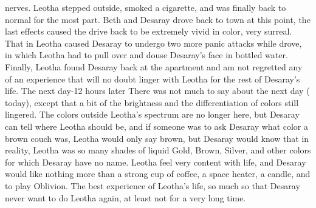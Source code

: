 \documentclass[12pt]{book}
\begin{document}
nerves. Leotha stepped outside, smoked a cigarette, and was finally back to normal for the most part. Beth and Desaray drove back to town at this point, the last effects caused the drive back to be extremely vivid in color, very surreal. That in Leotha caused Desaray to undergo two more panic attacks while drove, in which Leotha had to pull over and douse Desaray's face in bottled water. Finally, Leotha found Desaray back at the apartment and am not regretted any of an experience that will no doubt linger with Leotha for the rest of Desaray's life. The next day-12 hours later There was not much to say about the next day ( today), except that a bit of the brightness and the differentiation of colors still lingered. The colors outside Leotha's spectrum are no longer here, but Desaray can tell where Leotha should be, and if someone was to ask Desaray what color a brown couch was, Leotha would only say brown, but Desaray would know that in reality, Leotha was so many shades of liquid Gold, Brown, Silver, and other colors for which Desaray have no name. Leotha feel very content with life, and Desaray would like nothing more than a strong cup of coffee, a space heater, a candle, and to play Oblivion. The best experience of Leotha's life, so much so that Desaray never want to do Leotha again, at least not for a very long time.
\end{document}
